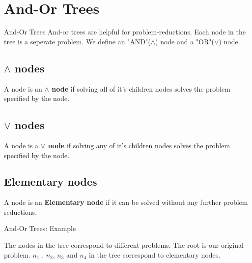 \documentclass{beamer}
\begin{document}
\section{And-Or Trees}
\begin{frame}{And-Or Trees}
 And-or trees are helpful for problem-reductions. Each node in the tree is a seperate problem.
 We define an "AND"($\wedge$) node and a "OR"($\vee$) node. \newline
   \subsection*{$\wedge$ nodes}
   A node is an \textbf{$\wedge$ node} if solving all of it's children nodes solves the problem specified by the node.
   \newline
   \subsection*{$\vee$ nodes}
  A node is a \textbf{$\vee$ node} if solving any of it's children nodes solves the problem specified by the node. 
  \newline
  \subsection*{Elementary nodes}
  A node is an \textbf{Elementary node} if it can be solved without any further problem reductions.
\end{frame}

  


\begin{frame}{And-Or Trees: Example}
	\vskip 1cm
   
 The nodes in the tree correspond to different problems. The root is our original problem. $n_{1}$ , $n_{2}$, $n_{3}$ and $n_{4}$ in the tree correspond to elementary nodes.\newline
  
\end{frame}
\end{document}

